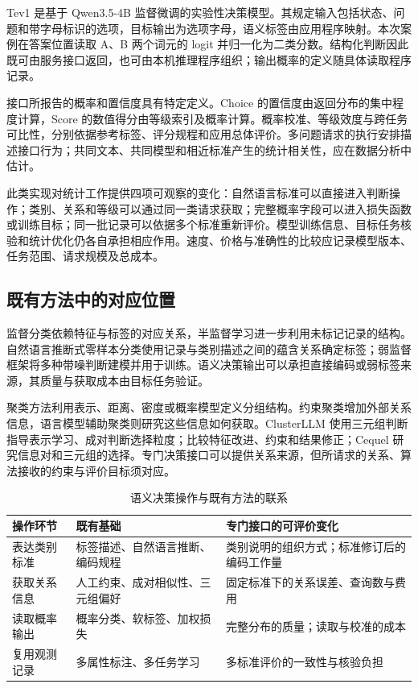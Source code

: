 \documentclass[UTF8,a4paper,zihao=-4,fontset=fandol]{ctexart}
\begin{document}
Tev1 是基于 Qwen3.5-4B 监督微调的实验性决策模型。其规定输入包括状态、问题和带字母标识的选项，目标输出为选项字母，语义标签由应用程序映射\citep{tev1-card}。本次案例在答案位置读取 A、B 两个词元的 logit 并归一化为二类分数。结构化判断因此既可由服务接口返回，也可由本机推理程序组织；输出概率的定义随具体读取程序记录。

接口所报告的概率和置信度具有特定定义。Choice 的置信度由返回分布的集中程度计算，Score 的数值得分由等级索引及概率计算\citep{typesafe-choice,typesafe-score}。概率校准、等级效度与跨任务可比性，分别依据参考标签、评分规程和应用总体评价。多问题请求的执行安排描述接口行为；共同文本、共同模型和相近标准产生的统计相关性，应在数据分析中估计。

此类实现对统计工作提供四项可观察的变化：自然语言标准可以直接进入判断操作；类别、关系和等级可以通过同一类请求获取；完整概率字段可以进入损失函数或训练目标；同一批记录可以依据多个标准重新评价。模型训练信息、目标任务核验和统计优化仍各自承担相应作用。速度、价格与准确性的比较应记录模型版本、任务范围、请求规模及总成本。

\subsection{既有方法中的对应位置}

监督分类依赖特征与标签的对应关系，半监督学习进一步利用未标记记录的结构。自然语言推断式零样本分类使用记录与类别描述之间的蕴含关系确定标签\citep{yin2019}；弱监督框架将多种带噪判断建模并用于训练\citep{ratner2017}。语义决策输出可以承担直接编码或弱标签来源，其质量与获取成本由目标任务验证。

聚类方法利用表示、距离、密度或概率模型定义分组结构。约束聚类增加外部关系信息，语言模型辅助聚类则研究这些信息如何获取。ClusterLLM 使用三元组判断指导表示学习、成对判断选择粒度；\citet{viswanathan2024}比较特征改进、约束和结果修正；Cequel 研究信息对和三元组的选择\citep{clusterllm2023,cequel2025}。专门决策接口可以提供关系来源，但所请求的关系、算法接收的约束与评价目标须对应。

\begin{table}[htbp]
\centering\small
\caption{语义决策操作与既有方法的联系}\label{tab:history}
\begin{tabularx}{\textwidth}{@{}L{2.1cm}YY@{}}
\toprule
操作环节 & 既有基础 & 专门接口的可评价变化 \\
\midrule
表达类别标准 & 标签描述、自然语言推断、编码规程 & 类别说明的组织方式；标准修订后的编码工作量 \\
获取关系信息 & 人工约束、成对相似性、三元组偏好 & 固定标准下的关系误差、查询数与费用 \\
读取概率输出 & 概率分类、软标签、加权损失 & 完整分布的质量；读取与校准的成本 \\
复用观测记录 & 多属性标注、多任务学习 & 多标准评价的一致性与核验负担 \\
\bottomrule
\end{tabularx}
\end{table}
\end{document}
